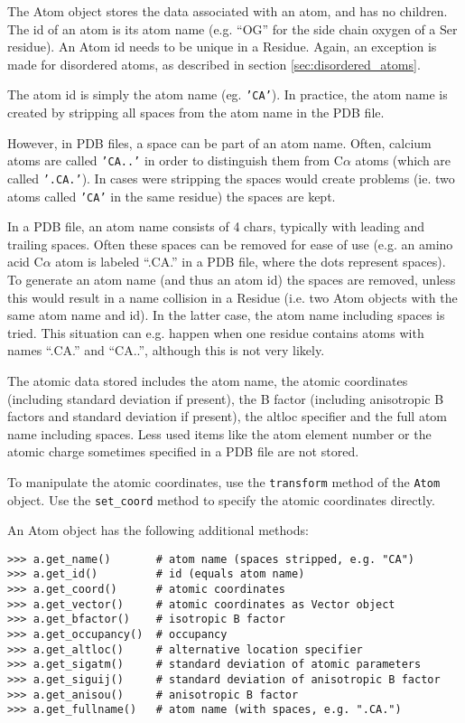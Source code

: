 The Atom object stores the data associated with an atom, and has no children.
The id of an atom is its atom name (e.g. ``OG'' for the side chain oxygen
of a Ser residue). An Atom id needs to be unique in a Residue. Again, an exception is made for disordered atoms, as described in section \ref{sec:disordered_atoms}.

The atom id is simply the atom name (eg. \texttt{'CA'}). In practice,
the atom name is created by stripping all spaces from the atom name
in the PDB file.

However, in PDB files, a space can be part of an atom name. Often,
calcium atoms are called \texttt{'CA..'} in order to distinguish them
from C$\alpha$ atoms (which are called \texttt{'.CA.'}). In cases
were stripping the spaces would create problems (ie. two atoms called
\texttt{'CA'} in the same residue) the spaces are kept.

In a PDB file, an atom name consists of 4 chars, typically with leading and
trailing spaces. Often these spaces can be removed for ease of use (e.g. an
amino acid C\( \alpha  \) atom is labeled ``.CA.'' in a PDB file, where
the dots represent spaces). To generate an atom name (and thus an atom id) the
spaces are removed, unless this would result in a name collision in a Residue
(i.e. two Atom objects with the same atom name and id). In the latter case,
the atom name including spaces is tried. This situation can e.g. happen when
one residue contains atoms with names ``.CA.'' and ``CA..'', although
this is not very likely.

The atomic data stored includes the atom name, the atomic coordinates (including
standard deviation if present), the B factor (including anisotropic B factors
and standard deviation if present), the altloc specifier and the full atom name
including spaces. Less used items like the atom element number or the atomic
charge sometimes specified in a PDB file are not stored.

To manipulate the atomic coordinates, use the \texttt{transform} method of
the \texttt{Atom} object. Use the \texttt{set\_coord} method to specify the
atomic coordinates directly.

An Atom object has the following additional methods:

\begin{verbatim}
>>> a.get_name()       # atom name (spaces stripped, e.g. "CA")
>>> a.get_id()         # id (equals atom name)
>>> a.get_coord()      # atomic coordinates
>>> a.get_vector()     # atomic coordinates as Vector object
>>> a.get_bfactor()    # isotropic B factor
>>> a.get_occupancy()  # occupancy
>>> a.get_altloc()     # alternative location specifier
>>> a.get_sigatm()     # standard deviation of atomic parameters
>>> a.get_siguij()     # standard deviation of anisotropic B factor
>>> a.get_anisou()     # anisotropic B factor
>>> a.get_fullname()   # atom name (with spaces, e.g. ".CA.")
\end{verbatim}

